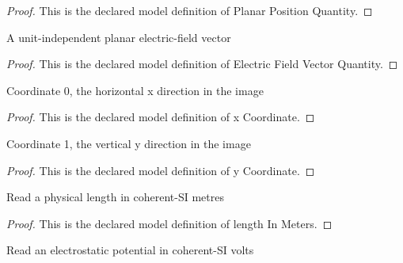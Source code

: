 \begin{proof}
  This is the declared model definition of Planar Position Quantity.
\end{proof}
\begin{definition}
  \label{def:physics:phyx-mini-0871:phyxminiproblems-problemphyxmini0871-electricfieldvectorquantity}
  A unit-independent planar electric-field vector
\end{definition}
\begin{proof}
  This is the declared model definition of Electric Field Vector Quantity.
\end{proof}
\begin{definition}[x Coordinate]
  \label{def:physics:phyx-mini-0871:phyxminiproblems-problemphyxmini0871-xcoordinate}
  Coordinate 0, the horizontal x direction in the image
\end{definition}
\begin{proof}
  This is the declared model definition of x Coordinate.
\end{proof}
\begin{definition}[y Coordinate]
  \label{def:physics:phyx-mini-0871:phyxminiproblems-problemphyxmini0871-ycoordinate}
  Coordinate 1, the vertical y direction in the image
\end{definition}
\begin{proof}
  This is the declared model definition of y Coordinate.
\end{proof}
\begin{definition}
  \label{def:physics:phyx-mini-0871:phyxminiproblems-problemphyxmini0871-lengthinmeters}
  Read a physical length in coherent-SI metres
\end{definition}
\begin{proof}
  This is the declared model definition of length In Meters.
\end{proof}
\begin{definition}
  \label{def:physics:phyx-mini-0871:phyxminiproblems-problemphyxmini0871-electricpotentialinvolts}
  Read an electrostatic potential in coherent-SI volts
\end{definition}
